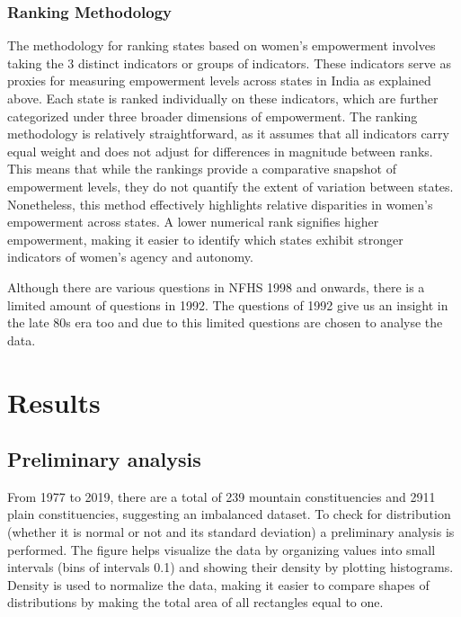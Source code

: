 \subsubsection{Ranking Methodology}
\label{ranking_methodology}
 The methodology for ranking states based on women's empowerment involves taking the 3 distinct indicators or groups of indicators. These indicators serve as proxies for measuring empowerment levels across states in India as explained above. Each state is ranked individually on these indicators, which are further categorized under three broader dimensions of empowerment. The ranking methodology is relatively straightforward, as it assumes that all indicators carry equal weight and does not adjust for differences in magnitude between ranks. This means that while the rankings provide a comparative snapshot of empowerment levels, they do not quantify the extent of variation between states. Nonetheless, this method effectively highlights relative disparities in women's empowerment across states. A lower numerical rank signifies higher empowerment, making it easier to identify which states exhibit stronger indicators of women's agency and autonomy.

\vspace{0.3cm}

Although there are various questions in NFHS 1998 and onwards, there is a limited amount of questions in 1992. The questions of 1992 give us an insight in the late 80s era too and due to this limited questions are chosen to analyse the data.


\section{Results}
\subsection{Preliminary analysis}

From 1977 to 2019, there are a total of 239 mountain constituencies and 2911 plain constituencies, suggesting an imbalanced dataset. To check for distribution (whether it is normal or not and its standard deviation) a preliminary analysis is performed. The figure helps visualize the data by organizing values into small intervals (bins of intervals 0.1) and showing their density by plotting histograms. Density is used to normalize the data, making it easier to compare shapes of distributions by making the total area of all rectangles equal to one.


